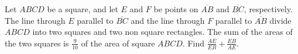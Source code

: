 Let $ABCD$ be a square, and let $E$ and $F$ be points on $\overline{AB}$ and $\overline{BC}$, respectively. The line through $E$ parallel to $\overline{BC}$ and the line through $F$ parallel to $\overline{AB}$ divide $ABCD$ into two squares and two non square rectangles. The sum of the areas of the two squares is $\frac{9}{10}$ of the area of square $ABCD$. Find $\frac{AE}{EB} + \frac{EB}{AE}$.